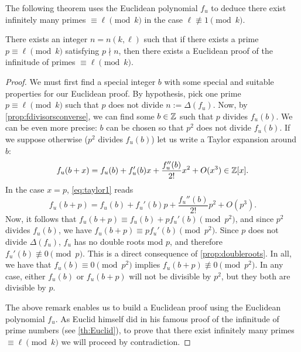\documentclass[../main.tex]{subfiles}
\begin{document}
 The following theorem uses the Euclidean polynomial $f_u$ to deduce there exist infinitely many primes $\equiv\ell\pmod{k}$ in the case $\ell\not\equiv 1\pmod{k}$.

\begin{theorem}\label{th:infiniteprimes}
There exists an integer $n=n(k,\ell)$ such that if there exists a prime $p \equiv \ell \pmod{k}$ satisfying $p\nmid n$, then there exists a Euclidean proof of the infinitude of primes $\equiv \ell \pmod{k}$.
\end{theorem}
\begin{proof}
	We must first find a special integer $b$ with some special and suitable properties for our Euclidean proof. By hypothesis, pick one prime $p\equiv \ell\pmod{k}$ such that $p$ does not divide $n:=\Delta(f_u)$. Now, by \cref{prop:fdivisorsconverse}, we can find some $b\in\mathbb{Z}$ such that $p$ divides $f_u(b)$. We can be even more precise: $b$ can be chosen so that $p^2$ does not divide $f_u(b)$. If we suppose otherwise ($p^2$ divides $f_u(b)$) let us write a Taylor expansion around $b$:
	\begin{equation} \label{eq:taylor1}
		f_u(b+x)=f_u(b)+f_u'(b)x+\frac{f_u''(b)}{2!}x^2+O(x^3)\in\mathbb{Z}[x].
	\end{equation} 
	In the case $x=p$, \cref{eq:taylor1} reads
	\begin{equation*}
		f_u(b+p)=f_u(b)+f_u'(b)p+\frac{f_u''(b)}{2!}p^2+O(p^3).
	\end{equation*}
	Now, it follows that $f_u(b+p)\equiv f_u(b)+pf_u'(b) \pmod{p^2}$, and since $p^2$ divides $f_u(b)$, we have $f_u(b+p)\equiv pf_u'(b) \pmod{p^2}$. Since $p$ does not divide $\Delta(f_u)$, $f_u$ has no double roots mod $p$, and therefore $f_u'(b)\not\equiv0 \pmod{p}$. This is a direct consequence of \cref{prop:doubleroots}. In all, we have that $f_u(b)\equiv0 \pmod{p^2}$ implies $f_u(b+p)\not\equiv 0 \pmod{p^2}$. In any case, either $f_u(b)$ or $f_u(b+p)$ will not be divisible by $p^2$, but they both are divisible by $p$.
	
	The above remark enables us to build a Euclidean proof using the Euclidean polynomial $f_u$. As Euclid himself did in his famous proof of the infinitude of prime numbers (see \cref{th:Euclid}), to prove that there exist infinitely many primes $\equiv \ell \pmod{k}$ we will proceed by contradiction. 
	

\end{proof}
\end{document}
